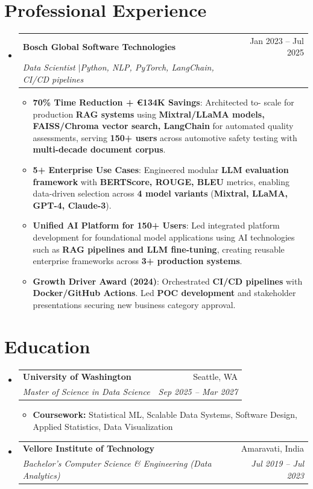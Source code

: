 \documentclass[letterpaper,10pt]{article}
\makeatletter
\newcommand{\resumeItem}[2]{
  \item\small{
    \textbf{#1}: #2 \vspace{-2pt}
  }
}
\newcommand{\resumeItemWithoutTitle}[1]{
  \item\small{
    #1 \vspace{-2pt}
  }
}
\newcommand{\resumeSubheading}[4]{
  \vspace{-1pt}\item
    \begin{tabular*}{0.97\textwidth}{l@{\extracolsep{\fill}}r}
      \textbf{#1} & #2 \\
      \textit{\small#3} & \textit{\small #4} \\
    \end{tabular*}\vspace{-5pt}
}
\newcommand{\resumeSubHeadingListStart}{\begin{itemize}[leftmargin=*]}
\newcommand{\resumeSubHeadingListEnd}{\end{itemize}}
\newcommand{\resumeItemListStart}{\begin{itemize}}
\newcommand{\resumeItemListEnd}{\end{itemize}\vspace{-2pt}}
\makeatother
\begin{document}
\section{Professional Experience}
\vspace{-2pt}
\resumeSubHeadingListStart
    \resumeSubheading
    {Bosch Global Software Technologies}{Jan 2023 -- Jul 2025}
    {Data Scientist $|$\small{\textit{Python, NLP, PyTorch, LangChain, CI/CD pipelines}}}{}
    \resumeItemListStart
      \resumeItem{\textbf{70\%} Time Reduction + \textbf{€134K} Savings}{Architected to- scale for production \textbf{RAG systems} using \textbf{Mixtral/LLaMA models, FAISS/Chroma vector search, LangChain} for automated quality assessments, serving \textbf{150+ users} across automotive safety testing with \textbf{multi-decade document corpus}.}
      \resumeItem{\textbf{5+} Enterprise Use Cases}{Engineered modular \textbf{LLM evaluation framework} with \textbf{BERTScore, ROUGE, BLEU} metrics, enabling data-driven selection across \textbf{4 model variants} (\textbf{Mixtral, LLaMA, GPT-4, Claude-3}).}
      \resumeItem{Unified AI Platform for \textbf{150+} Users}{Led integrated platform development for foundational model applications using AI technologies such as \textbf{RAG pipelines and LLM fine-tuning}, creating reusable enterprise frameworks across \textbf{3+ production systems}.}
      \resumeItem{\textbf{Growth Driver Award (2024)}}{Orchestrated \textbf{CI/CD pipelines} with \textbf{Docker/GitHub Actions}. Led \textbf{POC development} and stakeholder presentations securing new business category approval.}
    \resumeItemListEnd
\resumeSubHeadingListEnd


\section{Education}
\vspace{-2pt}
\resumeSubHeadingListStart
  \resumeSubheading
    {University of Washington}{Seattle, WA}
    {Master of Science in Data Science}{Sep 2025 -- Mar 2027}
  \resumeItemListStart
    \resumeItemWithoutTitle{\textbf{Coursework:} Statistical ML, Scalable Data Systems, Software Design, Applied Statistics, Data Visualization}
  \resumeItemListEnd
  
  \resumeSubheading
    {Vellore Institute of Technology}{Amaravati, India}
    {Bachelor's Computer Science \& Engineering (Data Analytics)}{Jul 2019 -- Jul 2023}
\resumeSubHeadingListEnd
\end{document}
